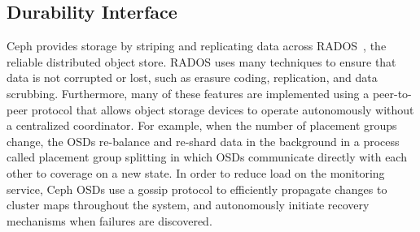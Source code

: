 \documentclass[preprint]{sigplanconf-eurosys}
\begin{document}




\subsection{Durability Interface}
\label{sec:durability}

Ceph provides storage by striping and replicating data across
RADOS~\cite{weil_rados_2007}, the reliable distributed object store. RADOS uses
many techniques to ensure that data is not corrupted or lost, such as erasure
coding, replication, and data scrubbing.  Furthermore, many of these features
are implemented using a peer-to-peer protocol that allows object storage
devices to operate autonomously without a centralized coordinator.  For
example, when the number of placement groups change, the OSDs re-balance and
re-shard data in the background in a process called placement group splitting
in which OSDs communicate directly with each other to coverage on a new state.
In order to reduce load on the monitoring service, Ceph OSDs use a gossip
protocol to efficiently propagate changes to cluster maps throughout the
system, and autonomously initiate recovery mechanisms when failures are
discovered.
\end{document}
